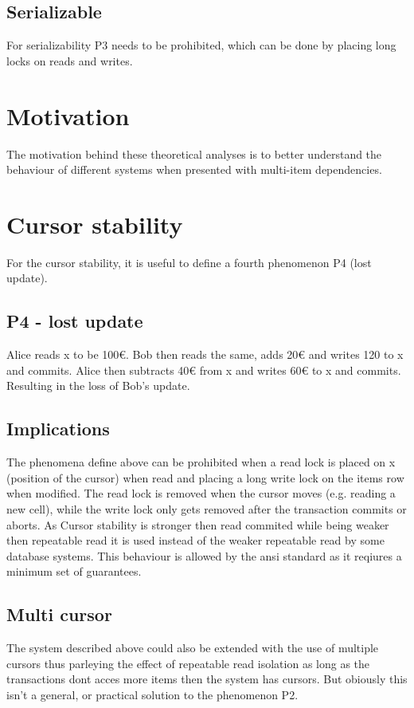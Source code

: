 \documentclass[sigconf, review=true]{acmart}
\begin{document}
\subsection{Serializable}
For serializability P3 needs to be prohibited, which can be done by placing long locks
on reads and writes.

\section{Motivation}
The motivation behind these theoretical analyses is to better understand the
behaviour of different systems when presented with multi-item dependencies.

\section{Cursor stability}
For the cursor stability, it is useful to define a fourth phenomenon P4 (lost update).
\subsection{ P4  - lost update}

Alice reads x to be 100€. Bob then reads the same, adds 20€ and writes 120 to x and commits.
Alice then subtracts 40€ from x and writes 60€ to x and commits. Resulting in the loss of Bob's update.
\subsection{Implications}
The phenomena define above can be prohibited when a read lock is placed on x (position of the cursor) when
read and placing a long write lock on the items row when modified.
The read lock is removed when the cursor moves (e.g. reading a new cell),
while the write lock only gets removed after the transaction commits or aborts.
As Cursor stability is stronger then read commited while being weaker then repeatable read it
is used instead of the weaker repeatable read by some database systems. This behaviour is allowed by the ansi standard
as it reqiures a minimum set of guarantees.
\subsection{Multi cursor}
The system described above could also be extended with the use of multiple cursors thus
parleying the effect of repeatable read isolation as long as the transactions dont acces more items
then the system has cursors. But obiously this isn't a general, or practical solution to the phenomenon P2.
\end{document}
